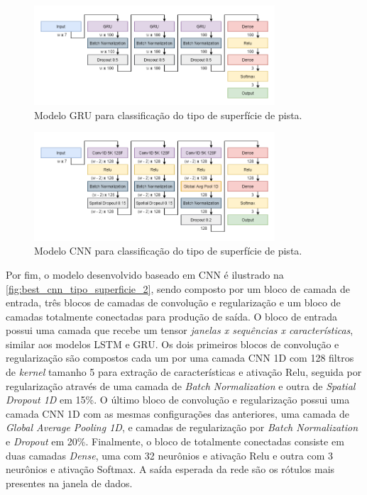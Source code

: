 \begin{figure}[h!]
  \centering
  \caption{Modelo GRU para classificação do tipo de superfície de pista.}
  \label{fig:best_gru_tipo_superficie_2}
  \includegraphics[width=0.8\textwidth]{figuras/fig_38.png}
\end{figure}

\begin{figure}[h!]
  \centering
  \caption{Modelo CNN para classificação do tipo de superfície de pista.}
  \label{fig:best_cnn_tipo_superficie_2}
  \includegraphics[width=0.8\textwidth]{figuras/fig_39.png}
\end{figure}

Por fim, o modelo desenvolvido baseado em CNN é ilustrado na \autoref{fig:best_cnn_tipo_superficie_2}, sendo composto por um bloco de camada de entrada, três blocos de camadas de convolução e regularização e um bloco de camadas totalmente conectadas para produção de saída. O bloco de entrada possui uma camada que recebe um tensor \emph{janelas x sequências x características}, similar aos modelos LSTM e GRU. Os dois primeiros blocos de convolução e regularização são compostos cada um por uma camada CNN 1D com 128 filtros de \textit{kernel} tamanho 5 para extração de características e ativação Relu, seguida por regularização através de uma camada de \textit{Batch Normalization} e outra de \textit{Spatial Dropout 1D} em 15\%. O último bloco de convolução e regularização possui uma camada CNN 1D com as mesmas configurações das anteriores, uma camada de \textit{Global Average Pooling 1D}, e camadas de regularização por \textit{Batch Normalization} e \textit{Dropout} em 20\%. Finalmente, o bloco de totalmente conectadas consiste em duas camadas \textit{Dense}, uma com 32 neurônios e ativação Relu e outra com 3 neurônios e ativação Softmax. A saída esperada da rede são os rótulos mais presentes na janela de dados.

